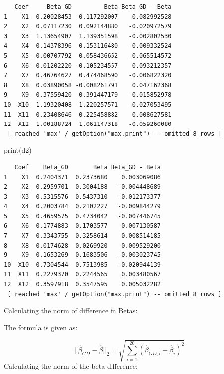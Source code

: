 \documentclass[
  letterpaper,
  DIV=11,
  numbers=noendperiod]{scrartcl}
\newenvironment{Shaded}{\begin{snugshade}}{\end{snugshade}}
\newcommand{\AttributeTok}[1]{\textcolor[rgb]{0.40,0.45,0.13}{#1}}
\newcommand{\DecValTok}[1]{\textcolor[rgb]{0.68,0.00,0.00}{#1}}
\newcommand{\FunctionTok}[1]{\textcolor[rgb]{0.28,0.35,0.67}{#1}}
\newcommand{\NormalTok}[1]{\textcolor[rgb]{0.00,0.23,0.31}{#1}}
\newcommand{\OtherTok}[1]{\textcolor[rgb]{0.00,0.23,0.31}{#1}}
\newcommand{\SpecialCharTok}[1]{\textcolor[rgb]{0.37,0.37,0.37}{#1}}
\newcommand{\StringTok}[1]{\textcolor[rgb]{0.13,0.47,0.30}{#1}}
\begin{document}
\begin{verbatim}
   Coef     Beta_GD         Beta Beta_GD - Beta
1    X1  0.20028453  0.117292007    0.082992528
2    X2  0.07117230  0.092144880   -0.020972579
3    X3  1.13654907  1.139351598   -0.002802530
4    X4  0.14378396  0.153116480   -0.009332524
5    X5 -0.00707792  0.058436652   -0.065514572
6    X6 -0.01202220 -0.105234557    0.093212357
7    X7  0.46764627  0.474468590   -0.006822320
8    X8  0.03890058 -0.008261791    0.047162368
9    X9  0.37559420  0.391447179   -0.015852978
10  X10  1.19320408  1.220257571   -0.027053495
11  X11  0.23408646  0.225458882    0.008627581
12  X12  1.00188724  1.061147318   -0.059260080
 [ reached 'max' / getOption("max.print") -- omitted 8 rows ]
\end{verbatim}

\begin{Shaded}
\begin{Highlighting}[]
\FunctionTok{print}\NormalTok{(d2)}
\end{Highlighting}
\end{Shaded}

\begin{verbatim}
   Coef    Beta_GD       Beta Beta_GD - Beta
1    X1  0.2404371  0.2373680    0.003069086
2    X2  0.2959701  0.3004188   -0.004448689
3    X3  0.5315576  0.5437310   -0.012173377
4    X4  0.2003784  0.2102227   -0.009844279
5    X5  0.4659575  0.4734042   -0.007446745
6    X6  0.1774883  0.1703577    0.007130587
7    X7  0.3343755  0.3258614    0.008514185
8    X8 -0.0174628 -0.0269920    0.009529200
9    X9  0.1653269  0.1683506   -0.003023745
10  X10  0.7304544  0.7513985   -0.020944139
11  X11  0.2279370  0.2244565    0.003480567
12  X12  0.3597918  0.3547595    0.005032282
 [ reached 'max' / getOption("max.print") -- omitted 8 rows ]
\end{verbatim}

Calculating the norm of difference in Betas:

The formula is given as:

\[
||\hat{\beta}_{GD} - \hat\beta||_2 = \sqrt{ \sum_{i=1}^{20} (\hat{\beta}_{GD, i} - \hat\beta_i)^2}
\] Calculating the norm of the beta difference:

\begin{Shaded}
\end{Shaded}
\end{document}
